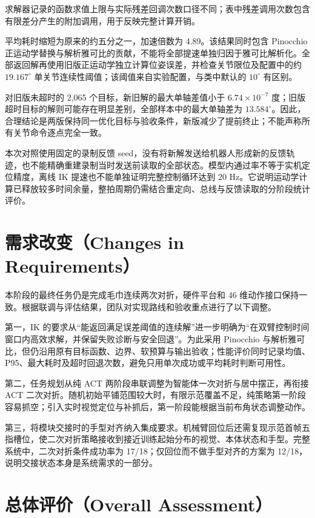 \documentclass[UTF8,a4paper,zihao=-4]{ctexart}
\begin{document}
求解器记录的函数求值上限与实际残差回调次数口径不同；表中残差调用次数包含有限差分产生的附加调用，用于反映完整计算开销。

平均耗时缩短为原来的约五分之一，加速倍数为 4.89。该结果同时包含 Pinocchio 正运动学替换与解析雅可比的贡献，不能将全部提速单独归因于雅可比解析化。全部返回解再使用旧版正运动学独立计算位姿误差，并检查关节限位及配置中的约 $19.167^\circ$ 单关节连续性阈值；该阈值来自实验配置，与类中默认的 $10^\circ$ 有区别。

对旧版未超时的 2,065 个目标，新旧解的最大单轴差值小于 $6.74\times10^{-7}$ 度；旧版超时目标的解则可能存在明显差别，全部样本中的最大单轴差为 $13.584^\circ$。因此，合理结论是两版保持同一优化目标与验收条件，新版减少了提前终止；不能声称所有关节命令逐点完全一致。

本次对照使用固定的录制反馈 seed，没有将新解发送给机器人形成新的反馈轨迹，也不能精确重建录制当时发送前读取的全部状态。模型内通过率不等于实机定位精度，离线 IK 提速也不能单独证明完整控制循环达到 20 Hz。它说明运动学计算已释放较多时间余量，整拍周期仍需结合重定向、总线与反馈读取的分阶段统计评价。

\section{需求改变（Changes in Requirements）}

本阶段的最终任务仍是完成毛巾连续两次对折，硬件平台和 46 维动作接口保持一致。根据联调与评估结果，团队对实现路线和验收重点进行了以下调整。

第一，IK 的要求从“能返回满足误差阈值的连续解”进一步明确为“在双臂控制时间窗口内高效求解，并保留失败诊断与安全回退”。为此采用 Pinocchio 与解析雅可比，但仍沿用原有目标函数、边界、软预算与输出验收；性能评价同时记录均值、P95、最大耗时及超时回退次数，避免只用单次成功或平均耗时判断可用性。

第二，任务规划从纯 ACT 两阶段串联调整为智能体一次对折与居中摆正，再衔接 ACT 二次对折。随机初始平铺范围较大时，有限示范覆盖不足，纯策略第一阶段容易抓空；引入实时视觉定位与补抓后，第一阶段能根据当前布角状态调整动作。

第三，将模块交接时的手型对齐纳入集成要求。机械臂回位后还需复现示范首帧五指槽位，使二次对折策略接收到接近训练起始分布的视觉、本体状态和手型。完整系统中，二次对折条件成功率为 17/18；仅回位而不做手型对齐的方案为 12/18，说明交接状态本身是系统需求的一部分。

\section{总体评价（Overall Assessment）}
\end{document}
